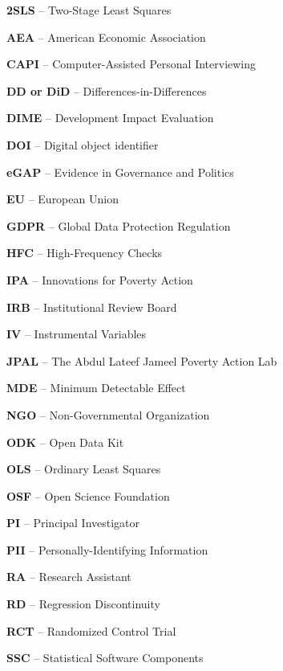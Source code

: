 \noindent\textbf{2SLS} -- Two-Stage Least Squares

\noindent\textbf{AEA} -- American Economic Association

\noindent\textbf{CAPI} -- Computer-Assisted Personal Interviewing

\noindent\textbf{DD or DiD} -- Differences-in-Differences

\noindent\textbf{DIME} -- Development Impact Evaluation

\noindent\textbf{DOI} -- Digital object identifier

\noindent\textbf{eGAP} -- Evidence in Governance and Politics

\noindent\textbf{EU} -- European Union

\noindent\textbf{GDPR} -- Global Data Protection Regulation

\noindent\textbf{HFC} -- High-Frequency Checks

\noindent\textbf{IPA} -- Innovations for Poverty Action

\noindent\textbf{IRB} -- Institutional Review Board

\noindent\textbf{IV} -- Instrumental Variables

\noindent\textbf{JPAL} -- The Abdul Lateef Jameel Poverty Action Lab

\noindent\textbf{MDE} -- Minimum Detectable Effect

\noindent\textbf{NGO} -- Non-Governmental Organization

\noindent\textbf{ODK} -- Open Data Kit

\noindent\textbf{OLS} -- Ordinary Least Squares

\noindent\textbf{OSF} -- Open Science Foundation

\noindent\textbf{PI} -- Principal Investigator

\noindent\textbf{PII} -- Personally-Identifying Information

\noindent\textbf{RA} -- Research Assistant

\noindent\textbf{RD} -- Regression Discontinuity

\noindent\textbf{RCT} -- Randomized Control Trial

\noindent\textbf{SSC} -- Statistical Software Components
